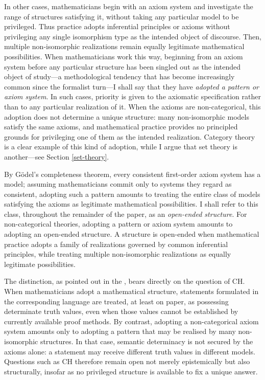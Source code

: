 \documentclass[11pt,a4paper]{article}
\begin{document}
In other cases, mathematicians begin with an axiom system and investigate the range of structures satisfying it, without taking any particular model to be privileged. Thus practice adopts inferential principles or axioms without privileging any single isomorphism type as the intended object of discourse. Then, multiple non-isomorphic realizations remain equally legitimate mathematical possibilities. When mathematicians work this way, beginning from an axiom system before any particular structure has been singled out as the intended object of study—a methodological tendency that has become increasingly common since the formalist turn—I shall say that they have \textit{adopted a pattern or axiom system}. In such cases, priority is given to the axiomatic specification rather than to any particular realization of it. When the axioms are non-categorical, this adoption does not determine a unique structure: many non-isomorphic models satisfy the same axioms, and mathematical practice provides no principled grounds for privileging one of them as the intended realization. Category theory is a clear example of this kind of adoption, while I argue that set theory is another---see Section \ref{set-theory}.

By Gödel's completeness theorem, every consistent first-order axiom system has a model; assuming mathematicians commit only to systems they regard as consistent, adopting such a pattern amounts to treating the entire class of models satisfying the axioms as legitimate mathematical possibilities. I shall refer to this class, throughout the remainder of the paper, as an \textit{open-ended structure}. For non-categorical theories, adopting a pattern or axiom system amounts to adopting an open-ended structure. A structure is open-ended when mathematical practice adopts a family of realizations governed by common inferential principles, while treating multiple non-isomorphic realizations as equally legitimate possibilities.

The distinction, as pointed out in the , bears directly on the question of CH. When mathematicians adopt a mathematical structure, statements formulated in the corresponding language are treated, at least on paper, as possessing determinate truth values, even when those values cannot be established by currently available proof methods. By contrast, adopting a non-categorical axiom system amounts only to adopting a pattern that may be realised by many non-isomorphic structures. In that case, semantic determinacy is not secured by the axioms alone: a statement may receive different truth values in different models. Questions such as $\mathrm{CH}$ therefore remain open not merely epistemically but also structurally, insofar as no privileged structure is available to fix a unique answer.
\end{document}
